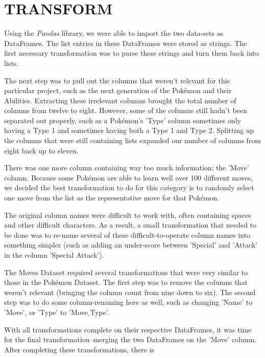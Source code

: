 \documentclass[10pt]{article}
\begin{document}

\section{TRANSFORM}
Using the \textit{Pandas} library, we were able to import the two data-sets as DataFrames. The list entries in these DataFrames were stored as strings. The first necessary transformation was to parse these strings and turn them back into lists.

The next step was to pull out the columns that weren't relevant for this particular project, such as the next generation of the Pokémon and their Abilities. Extracting these irrelevant columns brought the total number of columns from twelve to eight. However, some of the columns still hadn't been separated out properly, such as a Pokémon's 'Type' column sometimes only having a Type 1 and sometimes having both a Type 1 and Type 2. Splitting up the columns that were still containing lists expanded our number of columns from eight back up to eleven.

There was one more column containing way too much information: the 'Move' column. Because some Pokémon are able to learn well over 100 different moves, we decided the best transformation to do for this category is to randomly select one move from the list as the representative move for that Pokémon.

The original column names were difficult to work with, often containing spaces and other difficult characters. As a result, a small transformation that needed to be done was to re-name several of these difficult-to-operate column names into something simpler (such as adding an under-score between 'Special' and 'Attack' in the column 'Special Attack').

The Moves Dataset required several transformations that were very similar to those in the Pokémon Dataset. The first step was to remove the columns that weren't relevant (bringing the column count from nine down to six). The second step was to do some column-renaming here as well, such as changing 'Name' to 'Move', or 'Type' to 'Move$\_$Type'.

With all transformations complete on their respective DataFrames, it was time for the final transformation--merging the two DataFrames on the 'Move' column. After completing these transformations, there is 
\end{document}
